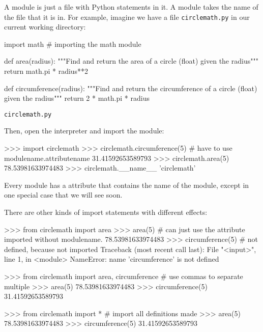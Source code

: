 \documentclass[11pt]{cselabheader}
\begin{document}
A module is just a file with Python statements in it. A module takes the name of
the file that it is in. For example, imagine we have a file
\texttt{circlemath.py} in our current working directory:

\begin{listing}[H]
\vspace{-0.5em}
\begin{python3code}
import math # importing the math module

def area(radius):
    """Find and return the area of a circle (float) given the radius"""
    return math.pi * radius**2

def circumference(radius):
    """Find and return the circumference of a circle (float) given the radius"""
    return 2 * math.pi * radius
\end{python3code}
\vspace{-1em}
\caption{\texttt{circlemath.py}}
\vspace{-0.5em}
\end{listing}

Then, open the interpreter and import the module:

\begin{pyconcode}
>>> import circlemath
>>> circlemath.circumference(5) # have to use modulename.attributename
31.41592653589793
>>> circlemath.area(5)
78.53981633974483
>>> circlemath.__name__
'circlemath'
\end{pyconcode}

Every module has a  attribute that contains the name of
the module, except in one special case that we will see soon.

There are other kinds of import statements with different effects:

\begin{pyconcode}
>>> from circlemath import area
>>> area(5) # can just use the attribute imported without modulename.
78.53981633974483
>>> circumference(5) # not defined, because not imported
Traceback (most recent call last):
  File "<input>", line 1, in <module>
NameError: name 'circumference' is not defined
\end{pyconcode}

\begin{pyconcode}
>>> from circlemath import area, circumference # use commas to separate multiple
>>> area(5)
78.53981633974483
>>> circumference(5)
31.41592653589793
\end{pyconcode}

\begin{pyconcode}
>>> from circlemath import * # import all definitions made
>>> area(5)
78.53981633974483
>>> circumference(5)
31.41592653589793
\end{pyconcode}
\end{document}
